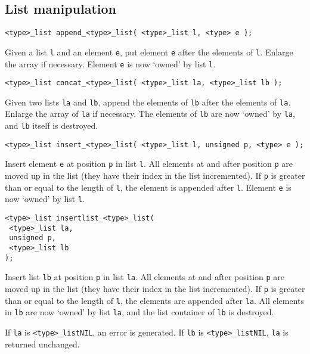 \subsection{List manipulation}
\begin{verbatim}
<type>_list append_<type>_list( <type>_list l, <type> e );
\end{verbatim}
\begin{desc}
Given a list \texttt{l} and an element \texttt{e},
put element \texttt{e} after the elements of \texttt{l}.
Enlarge the array if necessary.
Element \texttt{e} is now `owned' by list \texttt{l}.
\end{desc}
\begin{verbatim}
<type>_list concat_<type>_list( <type>_list la, <type>_list lb );
\end{verbatim}
\begin{desc}
Given two lists \texttt{la} and \texttt{lb},
append the elements of \texttt{lb} after the elements of \texttt{la}.
Enlarge the array of \texttt{la} if necessary.
The elements of \texttt{lb} are now `owned' by \texttt{la},
and \texttt{lb} itself is destroyed.
\end{desc}
\begin{verbatim}
<type>_list insert_<type>_list( <type>_list l, unsigned p, <type> e );
\end{verbatim}
\begin{desc}
Insert element \texttt{e} at position \texttt{p} in list \texttt{l}.
All elements at and after position \texttt{p} are moved up in the list
(they have their index in the list incremented).
If \texttt{p} is greater than or equal to the length of \texttt{l},
the element is appended after \texttt{l}.
Element \texttt{e} is now `owned' by list \texttt{l}.
\end{desc}
\begin{verbatim}
<type>_list insertlist_<type>_list(
 <type>_list la,
 unsigned p,
 <type>_list lb
);
\end{verbatim}
\begin{desc}
Insert list \texttt{lb} at position \texttt{p} in list \texttt{la}.
All elements at and after position \texttt{p} are moved up in the list
(they have their index in the list incremented).
If \texttt{p} is greater than or equal to the length of \texttt{l},
the elements are appended after \texttt{la}.
All elements in \texttt{lb} are now `owned' by list \texttt{la}, and the
list container of \texttt{lb} is destroyed.
\par
If \texttt{la} is \verb'<type>_listNIL', an error is generated.
If \texttt{lb} is \verb'<type>_listNIL', \texttt{la} is returned unchanged.
\end{desc}
